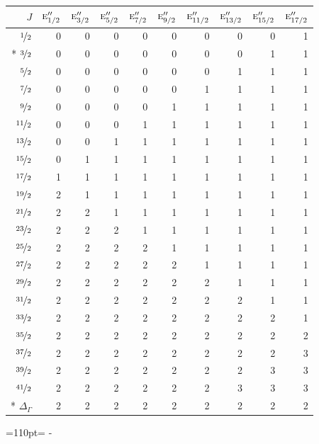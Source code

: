 \documentclass[10pt,a4paper]{article}
\makeatletter
\def\grouprule#1#2{\noalign{\marks\LTgroupmarks{\the\belowrulesep}\nobreak\vskip#1%
  \vskip\aboverulesep}\multispan\LT@cols\unskip{\leaders\hrule\@height#2\hfill\kern\z@}\cr
  \noalign{\penalty\LTrulebreak\vskip\belowrulesep\global\@lastruleclass\z@}}
\newcommand{\needspace}[1]{\par\penalty-100\begingroup\dimen0=#1\relax\dimen2=\pagegoal
  \advance\dimen2-\pagetotal\ifdim\dimen0>\dimen2\relax\ifdim\dimen2>0pt\vfil\break\fi\fi
  \endgroup}
\numberwithin{equation}{section}
\newcommand{\irr}[1]{\text{\normalfont\scshape #1}}
\makeatother
\begin{document}
{\small\begin{longtable}{@{}rrrrrrrrrr@{}}\toprule
$J$ & $\irr{e}_{1/2}''$ & $\irr{e}_{3/2}''$ & $\irr{e}_{5/2}''$ & $\irr{e}_{7/2}''$ & $\irr{e}_{9/2}''$ & $\irr{e}_{11/2}''$ & $\irr{e}_{13/2}''$ & $\irr{e}_{15/2}''$ & $\irr{e}_{17/2}''$\\\midrule\endhead
\bottomrule\endfoot\endlastfoot
$\nicefrac{1}{2}$ & 0 & 0 & 0 & 0 & 0 & 0 & 0 & 0 & 1\\*
$\nicefrac{3}{2}$ & 0 & 0 & 0 & 0 & 0 & 0 & 0 & 1 & 1\\
$\nicefrac{5}{2}$ & 0 & 0 & 0 & 0 & 0 & 0 & 1 & 1 & 1\\
$\nicefrac{7}{2}$ & 0 & 0 & 0 & 0 & 0 & 1 & 1 & 1 & 1\\
$\nicefrac{9}{2}$ & 0 & 0 & 0 & 0 & 1 & 1 & 1 & 1 & 1\\
$\nicefrac{11}{2}$ & 0 & 0 & 0 & 1 & 1 & 1 & 1 & 1 & 1\\
$\nicefrac{13}{2}$ & 0 & 0 & 1 & 1 & 1 & 1 & 1 & 1 & 1\\
$\nicefrac{15}{2}$ & 0 & 1 & 1 & 1 & 1 & 1 & 1 & 1 & 1\\
$\nicefrac{17}{2}$ & 1 & 1 & 1 & 1 & 1 & 1 & 1 & 1 & 1\\
$\nicefrac{19}{2}$ & 2 & 1 & 1 & 1 & 1 & 1 & 1 & 1 & 1\\
$\nicefrac{21}{2}$ & 2 & 2 & 1 & 1 & 1 & 1 & 1 & 1 & 1\\
$\nicefrac{23}{2}$ & 2 & 2 & 2 & 1 & 1 & 1 & 1 & 1 & 1\\
$\nicefrac{25}{2}$ & 2 & 2 & 2 & 2 & 1 & 1 & 1 & 1 & 1\\
$\nicefrac{27}{2}$ & 2 & 2 & 2 & 2 & 2 & 1 & 1 & 1 & 1\\
$\nicefrac{29}{2}$ & 2 & 2 & 2 & 2 & 2 & 2 & 1 & 1 & 1\\
$\nicefrac{31}{2}$ & 2 & 2 & 2 & 2 & 2 & 2 & 2 & 1 & 1\\
$\nicefrac{33}{2}$ & 2 & 2 & 2 & 2 & 2 & 2 & 2 & 2 & 1\\
$\nicefrac{35}{2}$ & 2 & 2 & 2 & 2 & 2 & 2 & 2 & 2 & 2\\
$\nicefrac{37}{2}$ & 2 & 2 & 2 & 2 & 2 & 2 & 2 & 2 & 3\\
$\nicefrac{39}{2}$ & 2 & 2 & 2 & 2 & 2 & 2 & 2 & 3 & 3\\
$\nicefrac{41}{2}$ & 2 & 2 & 2 & 2 & 2 & 2 & 3 & 3 & 3\\*
\grouprule{0pt}{\lightrulewidth} $\Delta_\Gamma$ & 2 & 2 & 2 & 2 & 2 & 2 & 2 & 2 & 2\\
\bottomrule\end{longtable}}
\needspace{110pt}
\end{document}
